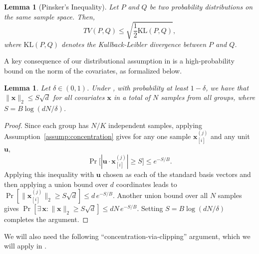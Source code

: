 \documentclass[11pt]{article}
\newcounter{thm}
\numberwithin{thm}{section}
\theoremstyle{plain}
\newtheorem{lemma}[thm]{Lemma}
\theoremstyle{definition}
\theoremstyle{remark} \newtheorem{remark}[thm]{Remark}
\def\vu{{\bm{u}}}
\def\vx{{\bm{x}}}
\newcommand{\vxij}{\vx_{[i]}^{(j)}}
\begin{document}
\begin{lemma}[Pinsker's Inequality]
\label{lem:pinsker}
Let \(P\) and \(Q\) be two probability distributions on the same sample space. Then,
\[
TV(P, Q) \le \sqrt{ \frac{1}{2} \mathrm{KL}(P, Q) },
\]
where \(\mathrm{KL}(P, Q)\) denotes the Kullback-Leibler divergence between \(P\) and \(Q\). 
\end{lemma}

A key consequence of our distributional assumption in  is a high-probability bound on the norm of the covariates, as formalized below.

\begin{lemma}\label{lemma:boundedness}
    Let $\delta \in (0, 1)$. Under , with probability at least $1-\delta$, we have that $\|\vx\|_2 \le S\sqrt{d}$ for all covariates $\vx$ in a total of $N$ samples from all groups, where $S=B\log(dN/\delta)$.
\end{lemma}

\begin{proof}
	Since each group has $N/K$ independent samples, applying Assumption~\ref{assump:concentration} gives for any one sample $\vxij$ and any unit $\vu$,  
	\[
	\Pr\bigl[|\vu\cdot\vxij|\ge S\bigr]\le e^{-S/B}.  
	\]
	Applying this inequality with $\vu$ chosen as each of the standard basis vectors and then applying a union bound over $d$ coordinates leads to  
	\(\Pr[\|\vxij\|_2\ge S\sqrt d]\le d\,e^{-S/B}.\)  Another union bound over all $N$ samples gives  
	\(\Pr[\exists\,\vx: \|\vx\|_2\ge S\sqrt d]\le dN\,e^{-S/B}.\)  
	Setting $S=B\log(dN/\delta)$ completes the argument.
\end{proof}


We will also need the following ``concentration-via-clipping'' argument, which we will apply in .
\end{document}
